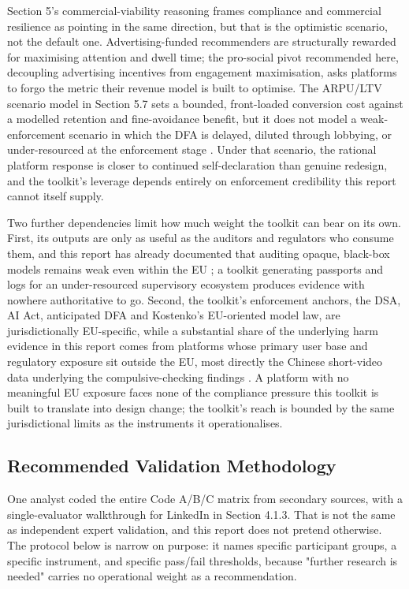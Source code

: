 \documentclass[11pt]{article}
\begin{document}
Section 5's commercial-viability reasoning frames compliance and commercial resilience as pointing in the same direction, but that is the optimistic scenario, not the default one. Advertising-funded recommenders are structurally rewarded for maximising attention and dwell time; the pro-social pivot recommended here, decoupling advertising incentives from engagement maximisation, asks platforms to forgo the metric their revenue model is built to optimise. The ARPU/LTV scenario model in Section 5.7 sets a bounded, front-loaded conversion cost against a modelled retention and fine-avoidance benefit, but it does not model a weak-enforcement scenario in which the DFA is delayed, diluted through lobbying, or under-resourced at the enforcement stage \parencites[390]{7896734}. Under that scenario, the rational platform response is closer to continued self-declaration than genuine redesign, and the toolkit's leverage depends entirely on enforcement credibility this report cannot itself supply.

Two further dependencies limit how much weight the toolkit can bear on its own. First, its outputs are only as useful as the auditors and regulators who consume them, and this report has already documented that auditing opaque, black-box models remains weak even within the EU \parencites[9]{7461574}[2]{1456534}; a toolkit generating passports and logs for an under-resourced supervisory ecosystem produces evidence with nowhere authoritative to go. Second, the toolkit's enforcement anchors, the DSA, AI Act, anticipated DFA and Kostenko's EU-oriented model law, are jurisdictionally EU-specific, while a substantial share of the underlying harm evidence in this report comes from platforms whose primary user base and regulatory exposure sit outside the EU, most directly the Chinese short-video data underlying the compulsive-checking findings \parencites[2]{8958037}[3]{8958037}. A platform with no meaningful EU exposure faces none of the compliance pressure this toolkit is built to translate into design change; the toolkit's reach is bounded by the same jurisdictional limits as the instruments it operationalises.

\subsection{Recommended Validation Methodology}
\label{sec:recommended_validation_methodology} One analyst coded the entire Code A/B/C matrix from secondary sources, with a single-evaluator walkthrough for LinkedIn in Section 4.1.3. That is not the same as independent expert validation, and this report does not pretend otherwise. The protocol below is narrow on purpose: it names specific participant groups, a specific instrument, and specific pass/fail thresholds, because "further research is needed" carries no operational weight as a recommendation.
\end{document}
